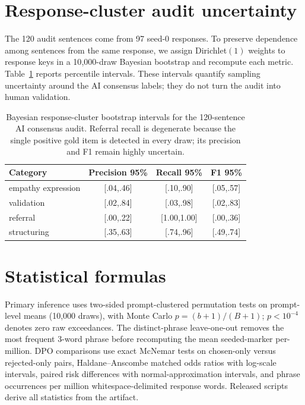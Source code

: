 \documentclass[11pt]{article}
\begin{document}
\section{Response-cluster audit uncertainty}
\label{app:audit-bootstrap}

The 120 audit sentences come from 97 seed-0 responses. To preserve dependence
among sentences from the same response, we assign Dirichlet$(1)$ weights to
response keys in a 10{,}000-draw Bayesian bootstrap and recompute each metric.
Table~\ref{tab:audit-bootstrap} reports percentile intervals. These intervals
quantify sampling uncertainty around the AI consensus labels; they do not turn
the audit into human validation.

\begin{table}[t]
\centering
\footnotesize
\setlength{\tabcolsep}{2pt}
\begin{tabular}{lccc}
\toprule
Category & Precision 95\% & Recall 95\% & F1 95\% \\
\midrule
empathy expression & [.04,.46] & [.10,.90] & [.05,.57] \\
validation         & [.02,.84] & [.03,.98] & [.02,.83] \\
referral           & [.00,.22] & [1.00,1.00] & [.00,.36] \\
structuring        & [.35,.63] & [.74,.96] & [.49,.74] \\
\bottomrule
\end{tabular}
\caption{Bayesian response-cluster bootstrap intervals for the 120-sentence
AI consensus audit. Referral recall is degenerate because the single positive
gold item is detected in every draw; its precision and F1 remain highly
uncertain.}
\label{tab:audit-bootstrap}
\end{table}

\section{Statistical formulas}
\label{app:formulas}

Primary inference uses two-sided prompt-clustered permutation tests on
prompt-level means (10{,}000 draws), with Monte Carlo
$p=(b+1)/(B+1)$; $p<10^{-4}$ denotes zero raw exceedances.
The distinct-phrase leave-one-out removes the most frequent 3-word phrase before
recomputing the mean seeded-marker per-million. DPO comparisons use exact McNemar
tests on chosen-only versus rejected-only pairs, Haldane--Anscombe matched odds
ratios with log-scale intervals, paired risk differences with normal-approximation
intervals, and phrase occurrences per million whitespace-delimited response
words. Released scripts derive all statistics from the artifact.
\end{document}
